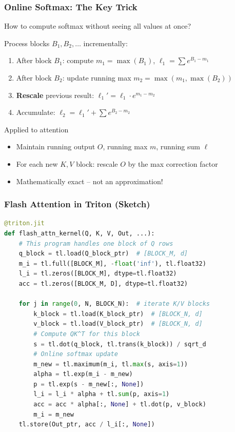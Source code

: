 \documentclass[aspectratio=169]{beamer}
\begin{document}
\begin{frame}
	\frametitle{Online Softmax: The Key Trick}
	How to compute softmax without seeing all values at once?
	\vspace{0.5em}

	Process blocks $B_1, B_2, \ldots$ incrementally:
	\begin{enumerate}
		\item After block $B_1$: compute $m_1 = \max(B_1)$, $\ell_1 = \sum e^{B_1 - m_1}$
		\item After block $B_2$: update running max $m_2 = \max(m_1, \max(B_2))$
		\item \textbf{Rescale} previous result: $\ell_1' = \ell_1 \cdot e^{m_1 - m_2}$
		\item Accumulate: $\ell_2 = \ell_1' + \sum e^{B_2 - m_2}$
	\end{enumerate}
	\vspace{0.5em}
	\begin{block}{Applied to attention}
		\begin{itemize}
			\item Maintain running output $O$, running max $m$, running sum $\ell$
			\item For each new $K, V$ block: rescale $O$ by the max correction factor
			\item Mathematically exact -- not an approximation!
		\end{itemize}
	\end{block}
\end{frame}

\begin{frame}[fragile]
	\frametitle{Flash Attention in Triton (Sketch)}
	\begin{lstlisting}[language=Python]
@triton.jit
def flash_attn_kernel(Q, K, V, Out, ...):
    # This program handles one block of Q rows
    q_block = tl.load(Q_block_ptr)  # [BLOCK_M, d]
    m_i = tl.full([BLOCK_M], -float('inf'), tl.float32)
    l_i = tl.zeros([BLOCK_M], dtype=tl.float32)
    acc = tl.zeros([BLOCK_M, D], dtype=tl.float32)

    for j in range(0, N, BLOCK_N):  # iterate K/V blocks
        k_block = tl.load(K_block_ptr)  # [BLOCK_N, d]
        v_block = tl.load(V_block_ptr)  # [BLOCK_N, d]
        # Compute QK^T for this block
        s = tl.dot(q_block, tl.trans(k_block)) / sqrt_d
        # Online softmax update
        m_new = tl.maximum(m_i, tl.max(s, axis=1))
        alpha = tl.exp(m_i - m_new)
        p = tl.exp(s - m_new[:, None])
        l_i = l_i * alpha + tl.sum(p, axis=1)
        acc = acc * alpha[:, None] + tl.dot(p, v_block)
        m_i = m_new
    tl.store(Out_ptr, acc / l_i[:, None])
	\end{lstlisting}
\end{frame}
\end{document}
